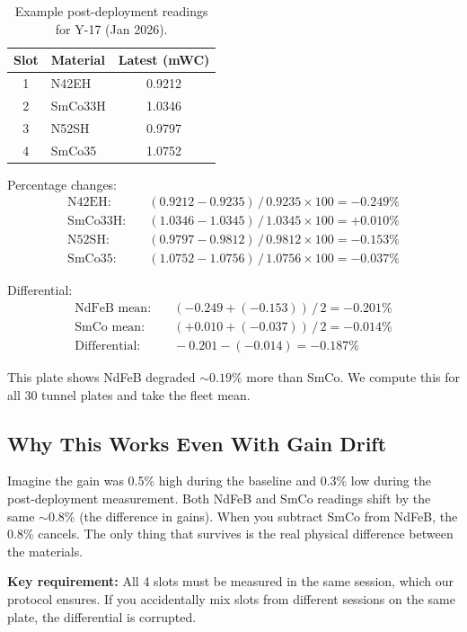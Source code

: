 \documentclass[11pt,letterpaper]{article}
\begin{document}
\begin{table}[htbp]
\centering
\caption{Example post-deployment readings for Y-17 (Jan 2026).}
\label{tab:diff-post}
\begin{tabular}{@{}clc@{}}
\toprule
Slot & Material & Latest (mWC) \\
\midrule
1 & N42EH   & 0.9212 \\
2 & SmCo33H & 1.0346 \\
3 & N52SH   & 0.9797 \\
4 & SmCo35  & 1.0752 \\
\bottomrule
\end{tabular}
\end{table}

Percentage changes:
\begin{align*}
\text{N42EH:}   &\quad (0.9212 - 0.9235)\,/\,0.9235 \times 100 = -0.249\% \\
\text{SmCo33H:} &\quad (1.0346 - 1.0345)\,/\,1.0345 \times 100 = +0.010\% \\
\text{N52SH:}   &\quad (0.9797 - 0.9812)\,/\,0.9812 \times 100 = -0.153\% \\
\text{SmCo35:}  &\quad (1.0752 - 1.0756)\,/\,1.0756 \times 100 = -0.037\%
\end{align*}

Differential:
\begin{align*}
\text{NdFeB mean:}   &\quad (-0.249 + (-0.153))\,/\,2 = -0.201\% \\
\text{SmCo mean:}    &\quad (+0.010 + (-0.037))\,/\,2 = -0.014\% \\
\text{Differential:} &\quad -0.201 - (-0.014) = -0.187\%
\end{align*}

This plate shows NdFeB degraded ${\sim}0.19\%$ more than SmCo. We compute this
for all 30 tunnel plates and take the fleet mean.

\subsection{Why This Works Even With Gain Drift}

Imagine the gain was 0.5\% high during the baseline and 0.3\% low during the
post-deployment measurement. Both NdFeB and SmCo readings shift by the same
${\sim}0.8\%$ (the difference in gains). When you subtract SmCo from NdFeB, the
0.8\% cancels. The only thing that survives is the real physical difference
between the materials.

\textbf{Key requirement:} All 4 slots must be measured in the same session,
which our protocol ensures. If you accidentally mix slots from different sessions
on the same plate, the differential is corrupted.
\end{document}
